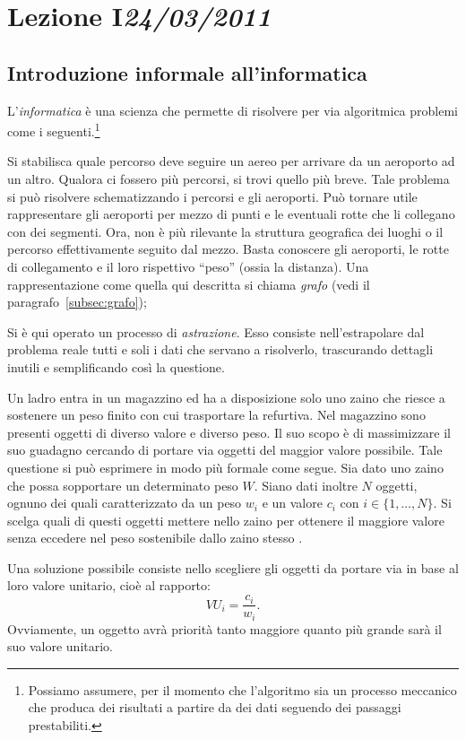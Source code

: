 \chapter[Lezione I]{Lezione I\newline\small{\emph{24/03/2011}}}
	\section{Introduzione informale all'informatica}
L'\emph{informatica} è una scienza che permette di risolvere per via algoritmica problemi come i seguenti.\footnote{Possiamo assumere, per il momento che l'algoritmo sia un processo meccanico che produca dei risultati a partire da dei dati seguendo dei passaggi prestabiliti.}


Si stabilisca quale percorso deve seguire un aereo per arrivare da un aeroporto ad un altro.
Qualora ci fossero più percorsi, si trovi quello più breve.
Tale problema si può risolvere schematizzando i percorsi e gli aeroporti.
Può tornare utile rappresentare gli aeroporti per mezzo di punti e le eventuali rotte che li collegano con dei segmenti.
Ora, non è più rilevante la struttura geografica dei luoghi o il percorso effettivamente seguito dal mezzo.
Basta conoscere gli aeroporti, le rotte di collegamento e il loro rispettivo ``peso'' (ossia la distanza).
Una rappresentazione come quella qui descritta si chiama \emph{grafo} (vedi il paragrafo~\vref{subsec:grafo});

Si è qui operato un processo di \emph{astrazione}. Esso consiste nell'estrapolare dal problema reale tutti e soli i dati che servano a risolverlo, trascurando dettagli inutili e semplificando così la questione.


Un ladro entra in un magazzino ed ha a disposizione solo uno zaino che riesce a sostenere un peso finito con cui trasportare la refurtiva.
Nel magazzino sono presenti oggetti di diverso valore e diverso peso.
Il suo scopo è di massimizzare il suo guadagno cercando di portare via oggetti del maggior valore possibile.
Tale questione si può esprimere in modo più formale come segue.
Sia dato uno zaino che possa sopportare un determinato peso $W$.
Siano dati inoltre $N$ oggetti, ognuno dei quali caratterizzato da un peso $w_i$ e un valore $c_i$ con $i\in\{1,\dots,N\}$.
Si scelga quali di questi oggetti mettere nello zaino per ottenere il maggiore valore senza eccedere nel peso sostenibile dallo zaino stesso \cite{wiki:zaino}.

Una soluzione possibile consiste nello scegliere gli oggetti da portare via in base al loro valore unitario, cioè al rapporto:
\[
VU_i=\frac{c_i}{w_i}.
\]
Ovviamente, un oggetto avrà priorità tanto maggiore quanto più grande sarà il suo valore unitario.


